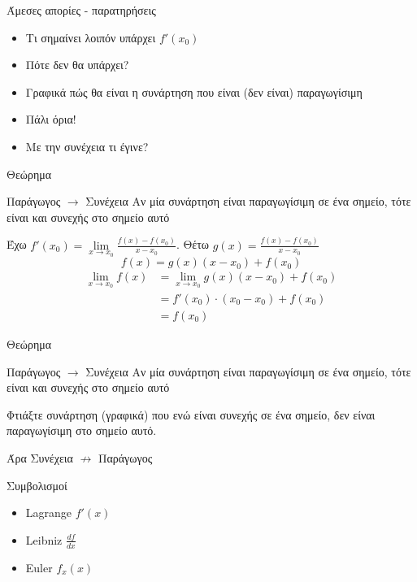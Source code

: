 \documentclass[greek]{beamer}
\begin{document}
\begin{frame}{Άμεσες απορίες - παρατηρήσεις}
  \begin{itemize}
    \item<1-> Τι σημαίνει λοιπόν υπάρχει $f'(x_0)$
    \item<2-> Πότε δεν θα υπάρχει?
    \item<3-> Γραφικά πώς θα είναι η συνάρτηση που είναι (δεν είναι) παραγωγίσιμη
    \item<4-> Πάλι όρια!
    \item<5-> Με την συνέχεια τι έγινε?
  \end{itemize}
\end{frame}

\begin{frame}{Θεώρημα}
  \begin{block}{Παράγωγος $\to$ Συνέχεια}
    Αν μία συνάρτηση είναι παραγωγίσιμη σε ένα σημείο, τότε είναι και συνεχής στο σημείο αυτό
  \end{block}
  Έχω $f'(x_0)=\lim\limits_{x \to x_0}{ \frac{f(x)-f(x_0)}{x-x_0} }$. Θέτω $g(x)=\frac{f(x)-f(x_0)}{x-x_0}$
  $$f(x)=g(x)(x-x_0)+f(x_0)$$
  \begin{align*}
    \lim\limits_{x \to x_0}{ f(x) } & =\lim\limits_{x \to x_0}{ g(x)(x-x_0)+f(x_0) } \\
                                    & =f'(x_0)\cdot (x_0-x_0)+f(x_0)                 \\
                                    & =f(x_0)
  \end{align*}
\end{frame}

\begin{frame}{Θεώρημα}
  \begin{block}{Παράγωγος $\to$ Συνέχεια}
    Αν μία συνάρτηση είναι παραγωγίσιμη σε ένα σημείο, τότε είναι και συνεχής στο σημείο αυτό
  \end{block}
   Φτιάξτε συνάρτηση (γραφικά) που ενώ είναι συνεχής σε ένα σημείο, δεν είναι παραγωγίσιμη στο σημείο αυτό.

   Άρα Συνέχεια $\nrightarrow$ Παράγωγος
\end{frame}

\begin{frame}{Συμβολισμοί}
  \begin{itemize}
    \item<1-> Lagrange $f'(x)$
    \item<2-> Leibniz $\frac{df}{dx}$
    \item<3-> Euler $f_x(x)$
  \end{itemize}
\end{frame}
\end{document}
